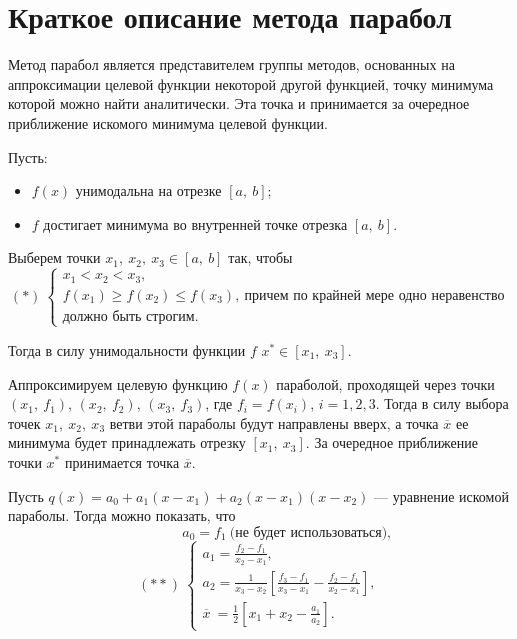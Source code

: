 \documentclass{bmstu}
\begin{document}
\section{Краткое описание метода парабол}

Метод парабол является представителем группы методов, основанных на аппроксимации целевой функции некоторой другой функцией, точку минимума которой можно найти аналитически. Эта точка и принимается за очередное приближение искомого минимума целевой функции.

Пусть:
\begin{itemize}
    \item $f(x)$ унимодальна на отрезке $[a, \ b]$;
    \item $f$ достигает минимума во внутренней точке отрезка $[a, \ b]$.
\end{itemize}

Выберем точки $x_1, \ x_2, \ x_3 \in [a, \ b]$ так, чтобы
\begin{equation}
    (*) \ 
    \begin{cases}
        x_1 < x_2 < x_3, \\
        f(x_1) \geqslant f(x_2) \leqslant f(x_3), \ \text{причем по крайней мере одно неравенство} \\
        \text{должно быть строгим}.
    \end{cases}
\end{equation}

Тогда в силу унимодальности функции $f$ $x^* \in [x_1, \ x_3]$.

Аппроксимируем целевую функцию $f(x)$ параболой, проходящей через точки $(x_1, \ f_1)$,  $(x_2, \ f_2)$,  $(x_3, \ f_3)$, где $f_i = f(x_i)$, $i = 1, 2, 3$.
Тогда в силу выбора точек $x_1, \ x_2, \ x_3$ ветви этой параболы будут направлены вверх, а точка $\overline{x}$ ее минимума будет принадлежать отрезку $[x_1, \ x_3]$. За очередное приближение точки $x^*$ принимается точка $\overline{x}$.

Пусть $q(x) = a_0 + a_1(x - x_1) +  a_2(x - x_1)(x - x_2)$ --- уравнение искомой параболы. Тогда можно показать, что 
\begin{equation*}
    \ \ \ \ \ \ \ \ \ \ \ \ \ \ \ \ \ \ a_0 = f_1 \ \text{(не будет использоваться)},
\end{equation*}
\begin{equation}
    (**) \ 
    \begin{cases}
        a_1 = \frac{f_2 - f_1}{x_2 - x_1}, \\
        a_2 = \frac{1}{x_3 - x_2} \left[ \frac{f_3 - f_1}{x_3 - x_1} - \frac{f_2 - f_1}{x_2 - x_1} \right], \\
        \overline{x} \ = \frac{1}{2} \left[ x_1 + x_2 - \frac{a_1}{a_2} \right].
    \end{cases}
\end{equation}
\end{document}
